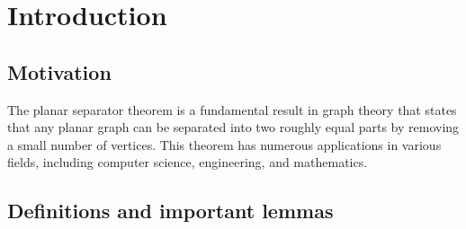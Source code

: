 \chapter{Introduction}

\section{Motivation}

The planar separator theorem is a fundamental result in graph theory that states that any planar graph can be separated into two roughly equal parts by removing a small number of vertices. This theorem has numerous applications in various fields, including computer science, engineering, and mathematics.

\cite{liptonApplicationsPlanarSeparator1977}
\cite{bar-yehudaApproximatingVertexCover1982}
\cite{chibaApplicationsLiptonTarjans1981}
\cite{liptonSeparatorTheoremPlanar1979}

\section{Definitions and important lemmas}
